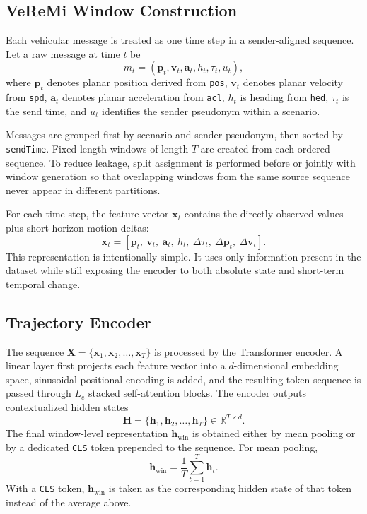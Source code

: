 \documentclass[12pt]{article}
\begin{document}
\FloatBarrier

\subsection{VeReMi Window Construction}\label{subsec:window}

Each vehicular message is treated as one time step in a sender-aligned sequence. Let a raw message at time $t$ be
\begin{equation}
m_t = (\mathbf{p}_t, \mathbf{v}_t, \mathbf{a}_t, h_t, \tau_t, u_t),
\end{equation}
where $\mathbf{p}_t$ denotes planar position derived from \texttt{pos}, $\mathbf{v}_t$ denotes planar velocity from \texttt{spd}, $\mathbf{a}_t$ denotes planar acceleration from \texttt{acl}, $h_t$ is heading from \texttt{hed}, $\tau_t$ is the send time, and $u_t$ identifies the sender pseudonym within a scenario.

Messages are grouped first by scenario and sender pseudonym, then sorted by \texttt{sendTime}. Fixed-length windows of length $T$ are created from each ordered sequence. To reduce leakage, split assignment is performed before or jointly with window generation so that overlapping windows from the same source sequence never appear in different partitions.

For each time step, the feature vector $\mathbf{x}_t$ contains the directly observed values plus short-horizon motion deltas:
\begin{equation}
\mathbf{x}_t = [\mathbf{p}_t,\ \mathbf{v}_t,\ \mathbf{a}_t,\ h_t,\ \Delta \tau_t,\ \Delta \mathbf{p}_t,\ \Delta \mathbf{v}_t].
\end{equation}
This representation is intentionally simple. It uses only information present in the dataset while still exposing the encoder to both absolute state and short-term temporal change.

\subsection{Trajectory Encoder}\label{subsec:encoder}

The sequence $\mathbf{X} = \{\mathbf{x}_1, \mathbf{x}_2, \ldots, \mathbf{x}_T\}$ is processed by the Transformer encoder. A linear layer first projects each feature vector into a $d$-dimensional embedding space, sinusoidal positional encoding is added, and the resulting token sequence is passed through $L_e$ stacked self-attention blocks. The encoder outputs contextualized hidden states
\begin{equation}
\mathbf{H} = \{\mathbf{h}_1, \mathbf{h}_2, \ldots, \mathbf{h}_T\} \in \mathbb{R}^{T \times d}.
\end{equation}
The final window-level representation $\mathbf{h}_{\text{win}}$ is obtained either by mean pooling or by a dedicated \texttt{CLS} token prepended to the sequence. For mean pooling,
\begin{equation}
\mathbf{h}_{\text{win}} = \frac{1}{T}\sum_{t=1}^{T} \mathbf{h}_t.
\end{equation}
With a \texttt{CLS} token, $\mathbf{h}_{\text{win}}$ is taken as the corresponding hidden state of that token instead of the average above.
\end{document}
